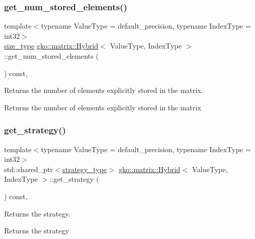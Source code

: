 \subsubsection{\texorpdfstring{get\+\_\+num\+\_\+stored\+\_\+elements()}{get\_num\_stored\_elements()}}
{\footnotesize\ttfamily template$<$typename Value\+Type = default\+\_\+precision, typename Index\+Type = int32$>$ \\
\hyperlink{namespacegko_a6e5c95df0ae4e47aab2f604a22d98ee7}{size\+\_\+type} \hyperlink{classgko_1_1matrix_1_1Hybrid}{gko\+::matrix\+::\+Hybrid}$<$ Value\+Type, Index\+Type $>$\+::get\+\_\+num\+\_\+stored\+\_\+elements (\begin{DoxyParamCaption}{ }\end{DoxyParamCaption}) const\hspace{0.3cm}{\ttfamily [inline]}, {\ttfamily [noexcept]}}



Returns the number of elements explicitly stored in the matrix. 

\begin{DoxyReturn}{Returns}
the number of elements explicitly stored in the matrix 
\end{DoxyReturn}
\mbox{\label{classgko_1_1matrix_1_1Hybrid_a8be764050176291d35e7b4dee1b6e1bc}} 
\subsubsection{\texorpdfstring{get\+\_\+strategy()}{get\_strategy()}}
{\footnotesize\ttfamily template$<$typename Value\+Type = default\+\_\+precision, typename Index\+Type = int32$>$ \\
std\+::shared\+\_\+ptr$<$\hyperlink{classgko_1_1matrix_1_1Hybrid_1_1strategy__type}{strategy\+\_\+type}$>$ \hyperlink{classgko_1_1matrix_1_1Hybrid}{gko\+::matrix\+::\+Hybrid}$<$ Value\+Type, Index\+Type $>$\+::get\+\_\+strategy (\begin{DoxyParamCaption}{ }\end{DoxyParamCaption}) const\hspace{0.3cm}{\ttfamily [inline]}, {\ttfamily [noexcept]}}



Returns the strategy. 

\begin{DoxyReturn}{Returns}
the strategy 
\end{DoxyReturn}
\mbox{\label{classgko_1_1matrix_1_1Hybrid_a401af55be629372e3114b67df6fc4d04}} 
